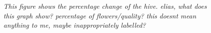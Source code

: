 		
		\begin{figure}
			\centering
			\caption{\textit{This figure shows the percentage change of the hive. elias, what does this graph show? percentage of flowers/quality? this doesnt mean anything to me, maybe inappropriately labelled?}}
			\label{fig:seasonalFlowers}
		\end{figure}
	
